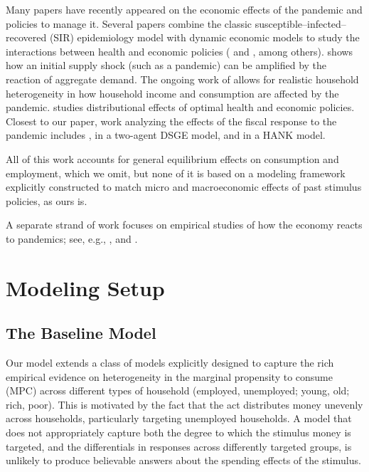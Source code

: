 \documentclass[titlepage]{\econtex}
\begin{document}
Many papers have recently appeared on the economic effects of the pandemic and policies to manage it.
Several papers combine the classic susceptible--infected--recovered (SIR) epidemiology model with dynamic economic models to study the interactions between health and economic policies (\cite{ert_covid} and \cite{aal_covid}, among others).
\cite{covidMacroImpl} shows how an initial supply shock (such as a pandemic) can be amplified by the reaction of aggregate demand.
The ongoing work of \cite{kmv_pandemics} allows for realistic household heterogeneity in how household income and consumption are affected by the pandemic.
\cite{healthWealth} studies distributional effects of optimal health and economic policies.
Closest to our paper, work analyzing the effects of the fiscal response to the pandemic includes \cite{faria_FPpandemic}, in a two-agent DSGE model, and \cite{bayer_corona} in a HANK model.

All of this work accounts for general equilibrium effects on consumption and employment, which we omit, but none of it is based on a modeling framework explicitly constructed to match micro and macroeconomic effects of past stimulus policies, as ours is.

A separate strand of work focuses on empirical studies of how the economy reacts to pandemics; see, e.g., \cite{baker_Cpandemic}, \cite{jorda_pandemics} and \cite{verner_pandemics}.

\section{Modeling Setup}

\subsection{The Baseline Model}

Our model extends a class of models explicitly designed to capture the rich empirical evidence on heterogeneity in the marginal propensity to consume (MPC) across different types of household (employed, unemployed; young, old; rich, poor).  This is motivated by the fact that the act distributes money unevenly across households, particularly targeting unemployed households.  A model that does not appropriately capture both the degree to which the stimulus money is targeted, and the differentials in responses across differently targeted groups, is unlikely to produce believable answers about the spending effects of the stimulus.
\end{document}
